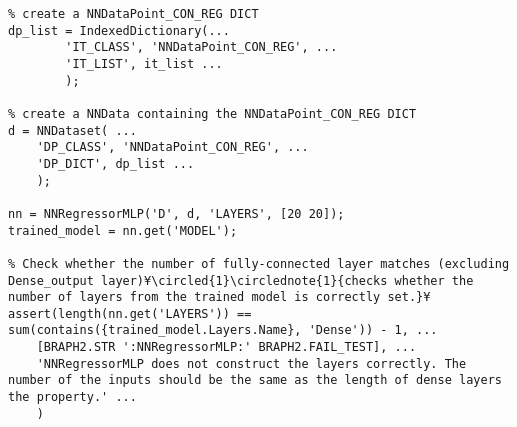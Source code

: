 \documentclass{tufte-handout}
\begin{document}
\begin{lstlisting}
% create a NNDataPoint_CON_REG DICT
dp_list = IndexedDictionary(...
        'IT_CLASS', 'NNDataPoint_CON_REG', ...
        'IT_LIST', it_list ...
        );

% create a NNData containing the NNDataPoint_CON_REG DICT
d = NNDataset( ...
    'DP_CLASS', 'NNDataPoint_CON_REG', ...
    'DP_DICT', dp_list ...
    );

nn = NNRegressorMLP('D', d, 'LAYERS', [20 20]);
trained_model = nn.get('MODEL');

% Check whether the number of fully-connected layer matches (excluding Dense_output layer)¥\circled{1}\circlednote{1}{checks whether the number of layers from the trained model is correctly set.}¥
assert(length(nn.get('LAYERS')) == sum(contains({trained_model.Layers.Name}, 'Dense')) - 1, ...
    [BRAPH2.STR ':NNRegressorMLP:' BRAPH2.FAIL_TEST], ...
    'NNRegressorMLP does not construct the layers correctly. The number of the inputs should be the same as the length of dense layers the property.' ...
    )

\end{lstlisting}

%
%
\end{document}
